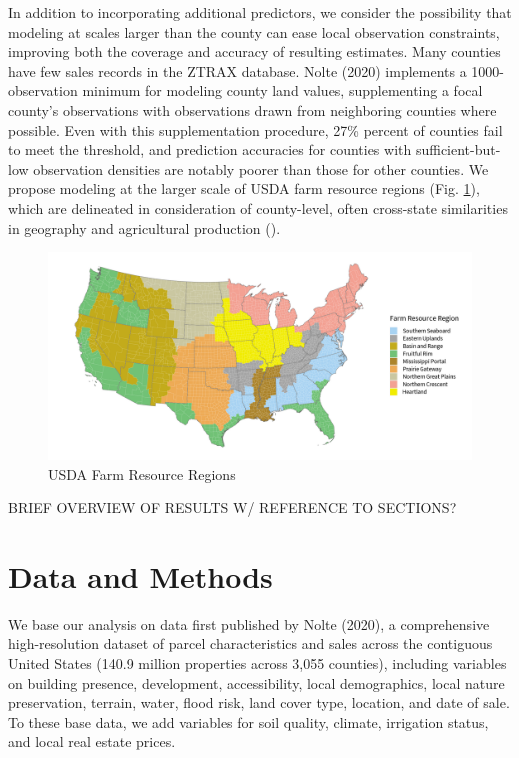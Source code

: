 \documentclass[12pt]{article}
\begin{document}
In addition to incorporating additional predictors, we consider the possibility that modeling at scales larger than the county can ease local observation constraints, improving both the coverage and accuracy of resulting estimates. Many counties have few sales records in the ZTRAX database. Nolte (2020) implements a 1000-observation minimum for modeling county land values, supplementing a focal county’s observations with observations drawn from neighboring counties where possible. Even with this supplementation procedure, 27\% percent of counties fail to meet the threshold, and prediction accuracies for counties with sufficient-but-low observation densities are notably poorer than those for other counties. We propose modeling at the larger scale of USDA farm resource regions (Fig. \ref{fig:frr_map}), which are delineated in consideration of county-level, often cross-state similarities in geography and agricultural production (\cite{FRR2000}).

\begin{figure}
    \centering
    \includegraphics[width=6in]{figures/FRR_map.png}
    \caption{USDA Farm Resource Regions}
    \label{fig:frr_map}
\end{figure}

BRIEF OVERVIEW OF RESULTS W/ REFERENCE TO SECTIONS? 


\section{Data and Methods}
We base our analysis on data first published by Nolte (2020), a comprehensive high-resolution dataset of parcel characteristics and sales across the contiguous United States (140.9 million properties across 3,055 counties), including variables on building presence, development, accessibility, local demographics, local nature preservation, terrain, water, flood risk, land cover type, location, and date of sale. To these base data, we add variables for soil quality, climate, irrigation status, and local real estate prices.
\end{document}
